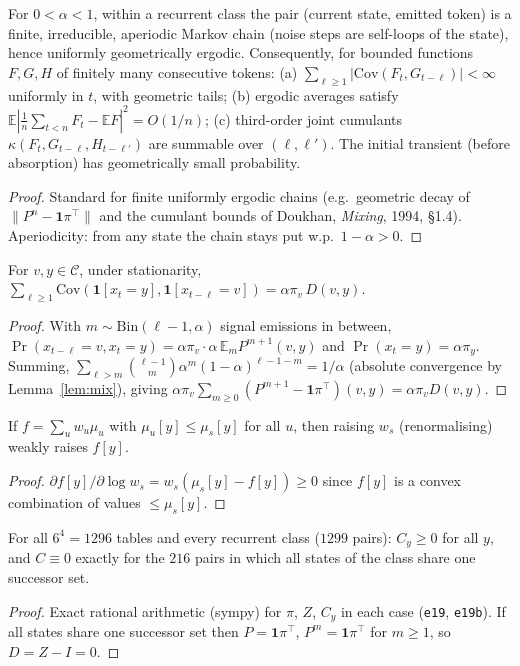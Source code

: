 \documentclass[11pt]{article}
\theoremstyle{definition}\newtheorem{assumption}{Assumption}\newtheorem{definition}{Definition}
\theoremstyle{remark}\newtheorem{remark}{Remark}
\newcommand{\1}{\mathbf{1}}\newcommand{\E}{\mathbb E}
\begin{document}
\begin{lemma}[mixing]\label{lem:mix}
For $0<\alpha<1$, within a recurrent class the pair (current state, emitted token) is a finite,
irreducible, aperiodic Markov chain (noise steps are self-loops of the state), hence uniformly
geometrically ergodic. Consequently, for bounded functions $F,G,H$ of finitely many consecutive tokens:
(a) $\sum_{\ell\ge1}|\mathrm{Cov}(F_t,G_{t-\ell})|<\infty$ uniformly in $t$, with geometric tails; (b) ergodic
averages satisfy $\E|\frac1n\sum_{t<n}F_t-\E F|^2=O(1/n)$; (c) third-order joint cumulants
$\kappa(F_t,G_{t-\ell},H_{t-\ell'})$ are summable over $(\ell,\ell')$. The initial transient (before absorption) has
geometrically small probability.
\end{lemma}
\begin{proof}
Standard for finite uniformly ergodic chains (e.g.\ geometric decay of $\|P^n-\1\pi^\top\|$ and the
cumulant bounds of Doukhan, \emph{Mixing}, 1994, \S1.4). Aperiodicity: from any state the chain stays put
w.p.\ $1-\alpha>0$.
\end{proof}

\begin{lemma}\label{lem:lag}
For $v,y\in\mathcal C$, under stationarity,
$\sum_{\ell\ge1}\mathrm{Cov}(\1[x_t=y],\1[x_{t-\ell}=v])=\alpha\pi_v\,D(v,y)$.
\end{lemma}
\begin{proof}
With $m\sim\mathrm{Bin}(\ell-1,\alpha)$ signal emissions in between, $\Pr(x_{t-\ell}=v,x_t=y)=\alpha\pi_v\cdot\alpha\,\E_mP^{m+1}(v,y)$
and $\Pr(x_t=y)=\alpha\pi_y$. Summing, $\sum_{\ell>m}\binom{\ell-1}m\alpha^m(1-\alpha)^{\ell-1-m}=1/\alpha$ (absolute
convergence by Lemma~\ref{lem:mix}), giving $\alpha\pi_v\sum_{m\ge0}(P^{m+1}-\1\pi^\top)(v,y)=\alpha\pi_vD(v,y)$.
\end{proof}

\begin{lemma}\label{lem:mixt}
If $f=\sum_uw_u\mu_u$ with $\mu_u[y]\le\mu_s[y]$ for all $u$, then raising $w_s$ (renormalising) weakly raises $f[y]$.
\end{lemma}
\begin{proof}$\partial f[y]/\partial\log w_s=w_s(\mu_s[y]-f[y])\ge0$ since $f[y]$ is a convex combination of values $\le\mu_s[y]$.\end{proof}

\begin{lemma}\label{lem:enum}
For all $6^4=1296$ tables and every recurrent class ($1299$ pairs): $C_y\ge0$ for all $y$, and $C\equiv0$
exactly for the $216$ pairs in which all states of the class share one successor set.
\end{lemma}
\begin{proof}
Exact rational arithmetic (sympy) for $\pi$, $Z$, $C_y$ in each case (\texttt{e19}, \texttt{e19b}). If all states
share one successor set then $P=\1\pi^\top$, $P^m=\1\pi^\top$ for $m\ge1$, so $D=Z-I=0$.
\end{proof}
\end{document}
